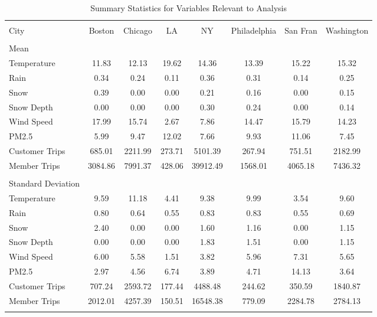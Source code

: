 \documentclass[12pt,letter paper]{article}
\begin{document}
\begin{table}[!htbp] \centering 
  
  \label{} 
\begin{tabular}{ lccccccc} 
\\[-1.8ex]\hline 
\hline \\[-1.8ex] 
City & Boston & Chicago & LA & NY & Philadelphia & San Fran & Washington \\ 
& & & & & & & \\
Mean & & & & & & & \\
\quad Temperature & 11.83 & 12.13 & 19.62 & 14.36 & 13.39 & 15.22 & 15.32 \\ 
\quad Rain & 0.34 & 0.24 & 0.11 & 0.36 & 0.31 & 0.14 & 0.25 \\ 
\quad Snow & 0.39 & 0.00 & 0.00 & 0.21 & 0.16 & 0.00 & 0.15 \\ 
\quad Snow Depth & 0.00 & 0.00 & 0.00 & 0.30 & 0.24 & 0.00 & 0.14 \\ 
\quad Wind Speed & 17.99 & 15.74 &  2.67 &  7.86 & 14.47 & 15.79 & 14.23 \\ 
\quad PM2.5 &  5.99 &  9.47 & 12.02 &  7.66 &  9.93 & 11.06 &  7.45 \\ 
\quad Customer Trips &  685.01 & 2211.99 &  273.71 & 5101.39 &  267.94 &  751.51 & 2182.99 \\ 
\quad Member Trips &  3084.86 &  7991.37 &   428.06 & 39912.49 &  1568.01 &  4065.18 &  7436.32 \\ 
 & & & & & & & \\
Standard Deviation & & & & & & & \\
\quad Temperature &  9.59 & 11.18 &  4.41 &  9.38 &  9.99 &  3.54 &  9.60 \\ 
\quad Rain & 0.80 & 0.64 & 0.55 & 0.83 & 0.83 & 0.55 & 0.69 \\ 
\quad Snow & 2.40 & 0.00 & 0.00 & 1.60 & 1.16 & 0.00 & 1.15 \\ 
\quad Snow Depth & 0.00 & 0.00 & 0.00 & 1.83 & 1.51 & 0.00 & 1.15 \\ 
\quad Wind Speed & 6.00 & 5.58 & 1.51 & 3.82 & 5.96 & 7.31 & 5.65 \\ 
\quad PM2.5 &  2.97 &  4.56 &  6.74 &  3.89 &  4.71 & 14.13 &  3.64 \\ 
\quad Customer Trips &  707.24 & 2593.72 &  177.44 & 4488.48 &  244.62 &  350.59 & 1840.87 \\ 
\quad Member Trips &  2012.01 &  4257.39 &   150.51 & 16548.38 &   779.09 &  2284.78 &  2784.13 \\ 
\hline \\[-1.8ex] 
\end{tabular} 
\caption{Summary Statistics for Variables Relevant to Analysis} 
\end{table} 
\end{document}
